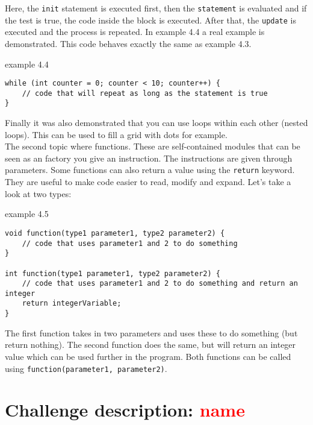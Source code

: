 Here, the \texttt{init} statement is executed first, then the \texttt{statement} is evaluated and if the test is true, the code inside the block is executed. After that, the \texttt{update} is executed and the process is repeated. In example 4.4 a real example is demonstrated. This code behaves exactly the same as example 4.3.

\begin{codebox}{example 4.4}
    \begin{lstlisting}
while (int counter = 0; counter < 10; counter++) {
    // code that will repeat as long as the statement is true
}
    \end{lstlisting}
\end{codebox}

Finally it was also demonstrated that you can use loops within each other (nested loops). This can be used to fill a grid with dots for example.\\

The second topic where functions. These are self-contained modules that can be seen as an factory you give an instruction. The instructions are given through parameters. Some functions can also return a value using the \texttt{return} keyword. They are useful to make code easier to read, modify and expand. Let's take a look at two types:

\begin{codebox}{example 4.5}
    \begin{lstlisting}
void function(type1 parameter1, type2 parameter2) {
    // code that uses parameter1 and 2 to do something
}

int function(type1 parameter1, type2 parameter2) {
    // code that uses parameter1 and 2 to do something and return an integer
    return integerVariable;
}
    \end{lstlisting}
\end{codebox}

The first function takes in two parameters and uses these to do something (but return nothing). The second function does the same, but will return an integer value which can be used further in the program. Both functions can be called using \texttt{function(parameter1, parameter2)}.

\section{Challenge description: \textcolor{red}{name}}

